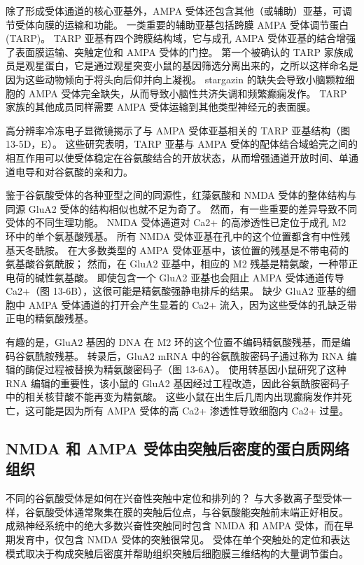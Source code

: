 除了形成受体通道的核心亚基外，AMPA 受体还包含其他（或辅助）亚基，可调节受体向膜的运输和功能。 
一类重要的辅助亚基包括跨膜 AMPA 受体调节蛋白 (TARP)。 
TARP 亚基有四个跨膜结构域，它与成孔 AMPA 受体亚基的结合增强了表面膜运输、突触定位和 AMPA 受体的门控。 
第一个被确认的 TARP 家族成员是观星蛋白，它是通过观星突变小鼠的基因筛选分离出来的，之所以这样命名是因为这些动物倾向于将头向后仰并向上凝视。 
stargazin 的缺失会导致小脑颗粒细胞的 AMPA 受体完全缺失，从而导致小脑性共济失调和频繁癫痫发作。 
TARP 家族的其他成员同样需要 AMPA 受体运输到其他类型神经元的表面膜。


高分辨率冷冻电子显微镜揭示了与 AMPA 受体亚基相关的 TARP 亚基结构（图 13-5D，E）。 
这些研究表明，TARP 亚基与 AMPA 受体的配体结合域蛤壳之间的相互作用可以使受体稳定在谷氨酸结合的开放状态，从而增强通道开放时间、单通道电导和对谷氨酸的亲和力。


鉴于谷氨酸受体的各种亚型之间的同源性，红藻氨酸和 NMDA 受体的整体结构与同源 GluA2 受体的结构相似也就不足为奇了。 
然而，有一些重要的差异导致不同受体的不同生理功能。 
NMDA 受体通道对 Ca2+ 的高渗透性已定位于成孔 M2 环中的单个氨基酸残基。 
所有 NMDA 受体亚基在孔中的这个位置都含有中性残基天冬酰胺。 
在大多数类型的 AMPA 受体亚基中，该位置的残基是不带电荷的氨基酸谷氨酰胺； 
然而，在 GluA2 亚基中，相应的 M2 残基是精氨酸，一种带正电荷的碱性氨基酸。 
即使包含一个 GluA2 亚基也会阻止 AMPA 受体通道传导 Ca2+（图 13-6B），这很可能是精氨酸强静电排斥的结果。 
缺少 GluA2 亚基的细胞中 AMPA 受体通道的打开会产生显着的 Ca2+ 流入，因为这些受体的孔缺乏带正电的精氨酸残基。


有趣的是，GluA2 基因的 DNA 在 M2 环的这个位置不编码精氨酸残基，而是编码谷氨酰胺残基。 
转录后，GluA2 mRNA 中的谷氨酰胺密码子通过称为 RNA 编辑的酶促过程被替换为精氨酸密码子（图 13-6A）。
使用转基因小鼠研究了这种 RNA 编辑的重要性，该小鼠的 GluA2 基因经过工程改造，因此谷氨酰胺密码子中的相关核苷酸不能再变为精氨酸。 
这些小鼠在出生后几周内出现癫痫发作并死亡，这可能是因为所有 AMPA 受体的高 Ca2+ 渗透性导致细胞内 Ca2+ 过量。



\subsection{NMDA 和 AMPA 受体由突触后密度的蛋白质网络组织}

不同的谷氨酸受体是如何在兴奋性突触中定位和排列的？ 
与大多数离子型受体一样，谷氨酸受体通常聚集在膜的突触后位点，与谷氨酸能突触前末端正好相反。 
成熟神经系统中的绝大多数兴奋性突触同时包含 NMDA 和 AMPA 受体，而在早期发育中，仅包含 NMDA 受体的突触很常见。 
受体在单个突触处的定位和表达模式取决于构成突触后密度并帮助组织突触后细胞膜三维结构的大量调节蛋白。


